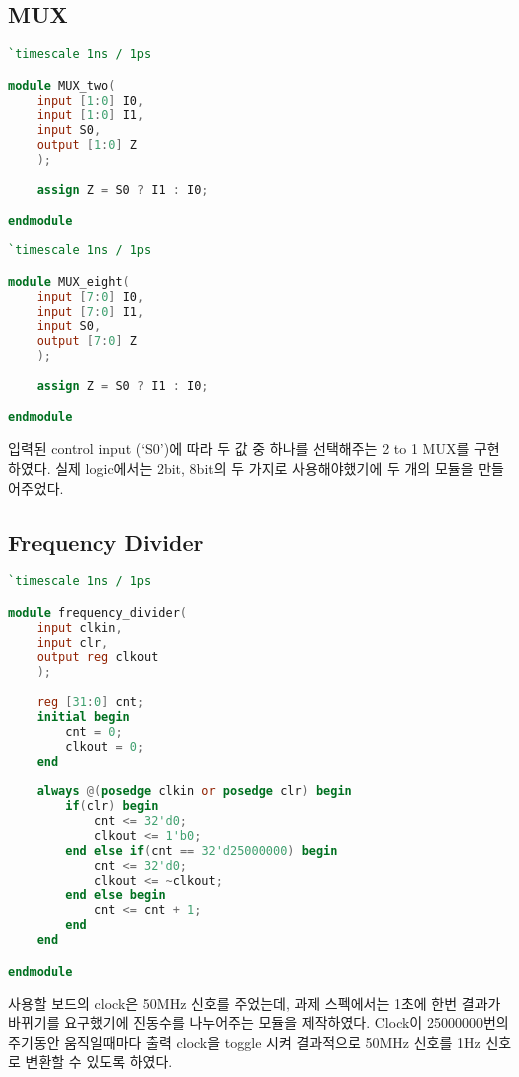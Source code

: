 \documentclass[10pt]{article}
\begin{document}
    \subsection{MUX}
    \begin{multicols}{2}
    \begin{lstlisting}[language=Verilog, caption=MUX\_two.v]
`timescale 1ns / 1ps

module MUX_two(
    input [1:0] I0,
	input [1:0] I1,
	input S0,
	output [1:0] Z
	);
	
	assign Z = S0 ? I1 : I0;

endmodule
    \end{lstlisting}
    \begin{lstlisting}[language=Verilog, caption=MUX\_eight.v]
`timescale 1ns / 1ps

module MUX_eight(
    input [7:0] I0,
	input [7:0] I1,
	input S0,
	output [7:0] Z
	);
	
	assign Z = S0 ? I1 : I0;

endmodule
    \end{lstlisting}
    \end{multicols}

    입력된 control input (`S0')에 따라 두 값 중 하나를 선택해주는 2 to 1 MUX를 구현하였다.
    실제 logic에서는 2bit, 8bit의 두 가지로 사용해야했기에 두 개의 모듈을 만들어주었다.
    
    \subsection{Frequency Divider}
    \begin{lstlisting}[language=Verilog, caption=frequency\_divider.v]
`timescale 1ns / 1ps

module frequency_divider(
    input clkin,
    input clr,
    output reg clkout
    );
	 
	reg [31:0] cnt;
	initial begin
        cnt = 0;
        clkout = 0;
	end
	
	always @(posedge clkin or posedge clr) begin
        if(clr) begin
            cnt <= 32'd0;
            clkout <= 1'b0;
        end else if(cnt == 32'd25000000) begin
            cnt <= 32'd0;
            clkout <= ~clkout;
        end else begin
            cnt <= cnt + 1;
        end
    end

endmodule
    \end{lstlisting}

    사용할 보드의 clock은 50MHz 신호를 주었는데, 과제 스펙에서는 1초에 한번 결과가 바뀌기를 요구했기에 진동수를 나누어주는 모듈을 제작하였다.
    Clock이 25000000번의 주기동안 움직일때마다 출력 clock을 toggle 시켜 결과적으로 50MHz 신호를 1Hz 신호로 변환할 수 있도록 하였다.
    
\end{document}
